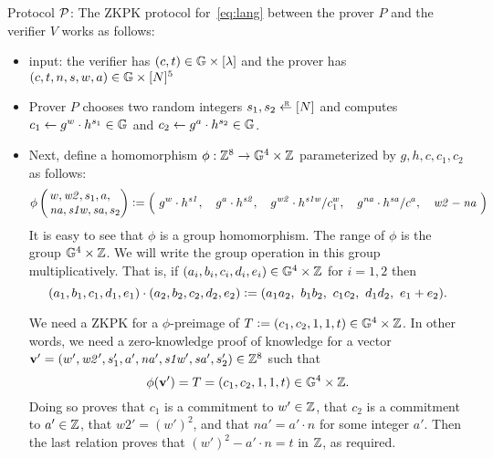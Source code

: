 \documentclass[11pt]{article}
\begin{document}
\medskip\noindent
Protocol $\mathcal{{P}}$: The ZKPK protocol for~\eqref{eq:lang} 
between the prover $P$ and the verifier $V$ works as follows:
\begin{itemize}
\item input:  the verifier has $(c, t) \in \mathbb G \times [{\lambda}]$ and 
the prover has $(c, t, n, s, w, a) \in \mathbb G \times [{N}]^5$  

\item Prover $P$ chooses two random integers $s_1, s_2 \rgets \range{N}$ and computes
       $c_1 \gets g^w \cdot h^{s_1} \in \mathbb G$ and $c_2 \gets g^a \cdot h^{s_2} \in \mathbb G$.

\item Next, define a homomorphism $\phi:\mathbb Z^8 \to \mathbb G^4 \times \mathbb Z$ 
parameterized by $g, h, c, c_1, c_2$ as follows:
\begin{equation} \label{eq:hom}
  \phi\left(\!\!\begin{array}{l}
                w, \mathit{w2}, s_1, a, \\
                \mathit{na}, \mathit{s1w}, \mathit{sa}, s_2
      \end{array}  \!\!\!\right) \deq
      \Bigl(\ 
       g^w \cdot h^{\mathit{s1}},\ \ \ 
       g^a \cdot h^{\mathit{s2}},\ \ \ 
       g^{\mathit{w2}} \cdot h^{\mathit{s1w}} / c_1^w,\ \ \ 
       g^{\mathit{na}} \cdot h^{\mathit{sa}} / c^a,\ \ \ 
       \mathit{w2} - \mathit{na}\ \Bigr)
\end{equation}
It is easy to see that $\phi$ is a group homomorphism.
The range of $\phi$ is the group $\mathbb G^4 \times \mathbb Z$.  
We will write the group operation in this group multiplicatively.
That is, if $(a_i, b_i, c_i, d_i, e_i) \in \mathbb G^4 \times \mathbb Z$ for $i=1,2$
then 
\[  (a_1, b_1, c_1, d_1, e_1) \cdot (a_2, b_2, c_2, d_2, e_2) \mathrel{\mathop:}= 
      (a_1 a_2,\ b_1 b_2,\ c_1 c_2,\ d_1 d_2,\ e_1 + e_2).  \]

We need a ZKPK for a $\phi$-preimage of 
$T \mathrel{\mathop:}= (c_1, c_2, 1, 1, t) \in \mathbb G^4 \times \mathbb Z$. 
In other words, we need a zero-knowledge proof of knowledge for a vector 
$\mathbf{v}' = (w', \mathit{w2}', s_1', a', \mathit{na}', 
              \mathit{s1w}', \mathit{sa}', s_2') \in \mathbb Z^8$ 
such that 
\[   \phi(\mathbf{v}') = T = (c_1, c_2, 1, 1, t) \in \mathbb G^4 \times \mathbb Z.  \]
Doing so proves 
that $c_1$ is a commitment to $w' \in \mathbb Z$, 
that $c_2$ is a commitment to $a' \in \mathbb Z$,
that $\mathit{w2}' = (w')^2$, and 
that $\mathit{na}' = a' \cdot n$ for some integer $a'$.
Then the last relation proves that $(w')^2 - a' \cdot n = t$ in $\mathbb Z$,
as required. 


\end{itemize}
\end{document}

